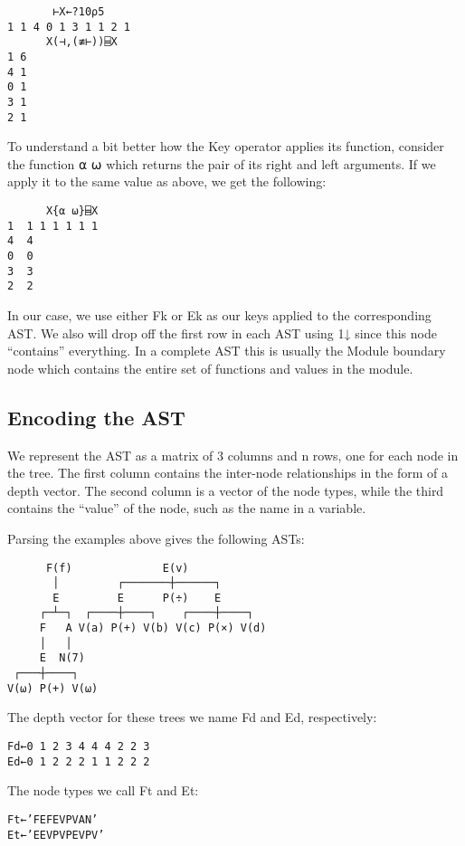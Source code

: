\documentclass[numbers,preprint]{sigplanconf}
\begin{document}
\begin{verbatim}
       ⊢X←?10⍴5
1 1 4 0 1 3 1 1 2 1
      X(⊣,(≢⊢))⌸X
1 6
4 1
0 1
3 1
2 1
\end{verbatim}

To understand a bit better how the Key operator applies its function,
consider the function {⍺ ⍵} which returns the pair of its right
and left arguments. If we apply it to the same value as above, we
get the following:

\begin{verbatim}
      X{⍺ ⍵}⌸X
1  1 1 1 1 1 1 
4  4           
0  0           
3  3           
2  2
\end{verbatim}

In our case, we use either Fk or Ek as our keys applied to the
corresponding AST. We also will drop off the first row in each AST
using 1↓ since this node “contains” everything. In a complete
AST this is usually the Module boundary node which contains the entire
set of functions and values in the module.

\subsection{Encoding the AST}

We represent the AST as a matrix of 3 columns and n rows, one for
each node in the tree. The first column contains the inter-node
relationships in the form of a depth vector. The second column is a
vector of the node types, while the third contains the “value”
of the node, such as the name in a variable.

Parsing the examples above gives the following ASTs:

\begin{verbatim}
      F(f)              E(v)
       │         ┌───────┼──────┐
       E         E      P(÷)    E
     ┌─┴─┐  ┌────┼────┐    ┌────┼────┐
     F   A V(a) P(+) V(b) V(c) P(×) V(d)
     │   │
     E  N(7) 
 ┌───┼────┐
V(⍵) P(+) V(⍵)
\end{verbatim}

The depth vector for these trees we name Fd and Ed, respectively:

\begin{verbatim}
Fd←0 1 2 3 4 4 4 2 2 3
Ed←0 1 2 2 2 1 1 2 2 2
\end{verbatim}

The node types we call Ft and Et:

\begin{verbatim}
Ft←’FEFEVPVAN’
Et←’EEVPVPEVPV’
\end{verbatim}
\end{document}
